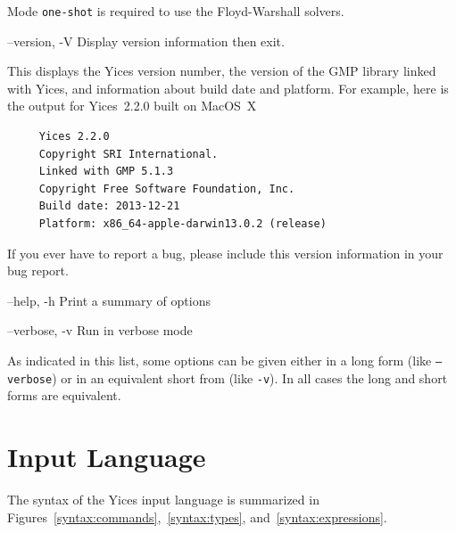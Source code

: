 \documentclass[11pt,twoside,fleqn,openright,titlepage]{cslreport}
\newenvironment{options}{
\begin{list}{}{
\setlength{\labelsep}{1.8ex}
\setlength{\labelwidth}{0pt}
\setlength{\itemindent}{-0.5\leftmargin}
\settowidth{\leftmargin}{\texttt{--}}
\renewcommand{\makelabel}{\optionlabel}}}
{\end{list}}
\newcommand*\optionlabel[1]{\hspace\labelsep\texttt{#1}}
\begin{document}
\begin{options}
  Mode \texttt{one-shot} is required to use the Floyd-Warshall solvers.

\item[--version, -V] Display version information then exit.

  This  displays the  Yices version  number,  the version  of the  GMP
  library  linked with  Yices, and  information about  build date  and
  platform. For example,  here is the output for  Yices~2.2.0 built on
  MacOS~X
  \begin{small}
  \begin{verbatim}
     Yices 2.2.0
     Copyright SRI International.
     Linked with GMP 5.1.3
     Copyright Free Software Foundation, Inc.
     Build date: 2013-12-21
     Platform: x86_64-apple-darwin13.0.2 (release)
  \end{verbatim}
  \end{small}
  \vspace*{-1em}
  If you ever have to report a bug, please include this version information
  in your bug report.

\item[--help, -h] Print a summary of options

\item[--verbose, -v] Run in verbose mode
\end{options}
As indicated in this list, some options can be given either in a long
form (like \texttt{--verbose}) or in an equivalent short from (like
\texttt{-v}). In all cases the long and short forms are equivalent.

\section{Input Language}

The   syntax  of   the   Yices  input   language   is  summarized   in
Figures~\ref{syntax:commands},~\ref{syntax:types},
and~\ref{syntax:expressions}.
\end{document}
